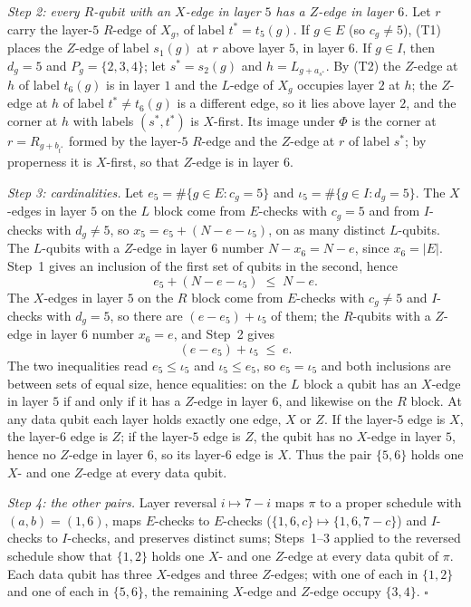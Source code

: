 \documentclass[reprint,twocolumn,superscriptaddress,nofootinbib]{revtex4-2}
\theoremstyle{plain}
\begin{document}
\emph{Step 2: every $R$-qubit with an $X$-edge in layer $5$ has a
$Z$-edge in layer $6$.} Let $r$ carry the layer-$5$ $R$-edge of $X_g$, of
label $t^\ast=t_5(g)$. If $g\in E$ (so $c_g\neq5$), (T1) places the
$Z$-edge of label $s_1(g)$ at $r$ above layer $5$, in layer $6$. If
$g\in I$, then $d_g=5$ and $P_g=\{2,3,4\}$; let $s^\ast=s_2(g)$ and
$h=L_{g+a_{s^\ast}}$. By (T2) the $Z$-edge at $h$ of label $t_6(g)$ is in
layer $1$ and the $L$-edge of $X_g$ occupies layer $2$ at $h$; the
$Z$-edge at $h$ of label $t^\ast\neq t_6(g)$ is a different edge, so it
lies above layer $2$, and the corner at $h$ with labels
$(s^\ast,t^\ast)$ is $X$-first. Its image under $\Phi$ is the corner at
$r=R_{g+b_{t^\ast}}$ formed by the layer-$5$ $R$-edge and the $Z$-edge at
$r$ of label $s^\ast$; by properness it is $X$-first, so that $Z$-edge is
in layer $6$.

\emph{Step 3: cardinalities.} Let $e_5=\#\{g\in E:c_g=5\}$ and
$\iota_5=\#\{g\in I:d_g=5\}$. The $X$-edges in layer $5$ on the $L$
block come from $E$-checks with $c_g=5$ and from $I$-checks with
$d_g\neq5$, so $x_5=e_5+(N-e-\iota_5)$, on as many distinct $L$-qubits.
The $L$-qubits with a $Z$-edge in layer $6$ number $N-x_6=N-e$, since
$x_6=|E|$. Step~1 gives an inclusion of the first set of qubits in the
second, hence
\begin{equation}
e_5+(N-e-\iota_5)\;\le\;N-e .
\end{equation}
The $X$-edges in layer $5$ on the $R$ block come from $E$-checks with
$c_g\neq5$ and $I$-checks with $d_g=5$, so there are $(e-e_5)+\iota_5$ of
them; the $R$-qubits with a $Z$-edge in layer $6$ number $x_6=e$, and
Step~2 gives
\begin{equation}
(e-e_5)+\iota_5\;\le\;e .
\end{equation}
The two inequalities read $e_5\le\iota_5$ and $\iota_5\le e_5$, so
$e_5=\iota_5$ and both inclusions are between sets of equal size, hence
equalities: on the $L$ block a qubit has an $X$-edge in layer $5$ if and
only if it has a $Z$-edge in layer $6$, and likewise on the $R$ block.
At any data qubit each layer holds exactly one edge, $X$ or $Z$. If the
layer-$5$ edge is $X$, the layer-$6$ edge is $Z$; if the layer-$5$ edge
is $Z$, the qubit has no $X$-edge in layer $5$, hence no $Z$-edge in
layer $6$, so its layer-$6$ edge is $X$. Thus the pair $\{5,6\}$ holds one
$X$- and one $Z$-edge at every data qubit.

\emph{Step 4: the other pairs.} Layer reversal $i\mapsto7-i$ maps $\pi$
to a proper schedule with $(a,b)=(1,6)$, maps $E$-checks to $E$-checks
($\{1,6,c\}\mapsto\{1,6,7-c\}$) and $I$-checks to $I$-checks, and
preserves distinct sums; Steps~1--3 applied to the reversed schedule
show that $\{1,2\}$ holds one $X$- and one $Z$-edge at every data qubit
of $\pi$. Each data qubit has three $X$-edges and three $Z$-edges; with
one of each in $\{1,2\}$ and one of each in $\{5,6\}$, the remaining
$X$-edge and $Z$-edge occupy $\{3,4\}$. \hfill$\square$
\end{document}

